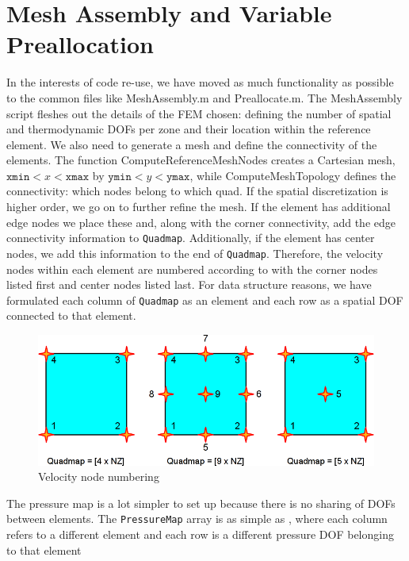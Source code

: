 \section{Mesh Assembly and Variable Preallocation}
In the interests of code re-use, we have moved as much functionality as possible to the common files like \textsf{MeshAssembly.m} and \textsf{Preallocate.m}. The \textsf{MeshAssembly} script fleshes out the details of the FEM chosen: defining the number of spatial and thermodynamic DOFs per zone and their location within the reference element. We also need to generate a mesh and define the connectivity of the elements. The function \textsf{ComputeReferenceMeshNodes} creates a Cartesian mesh, $\mathtt{xmin} < x < \mathtt{xmax}$ by $\mathtt{ymin} < y < \mathtt{ymax}$, while \textsf{ComputeMeshTopology} defines the connectivity: which nodes belong to which quad. If the spatial discretization is higher order, we go on to further refine the mesh. If the element has additional edge nodes we place these and, along with the corner connectivity, add the edge connectivity information to \texttt{Quadmap}. Additionally, if the element has center nodes, we add this information to the end of \texttt{Quadmap}. Therefore, the velocity nodes within each element are numbered according to  with the corner nodes listed first and center nodes listed last. For data structure reasons, we have formulated each column of \texttt{Quadmap} as an element and each row as a spatial DOF connected to that element.

\begin{figure}[h!]
 \centering
 \includegraphics[width=6in,keepaspectratio=true]{./Figures/VelNodeNumbering.png}
 \caption{Velocity node numbering}
 \label{fig:VelNodeNumbering}
\end{figure}

The pressure map is a lot simpler to set up because there is no sharing of DOFs between elements. The \texttt{PressureMap} array is as simple as , where each column refers to a different element and each row is a different pressure DOF belonging to that element

